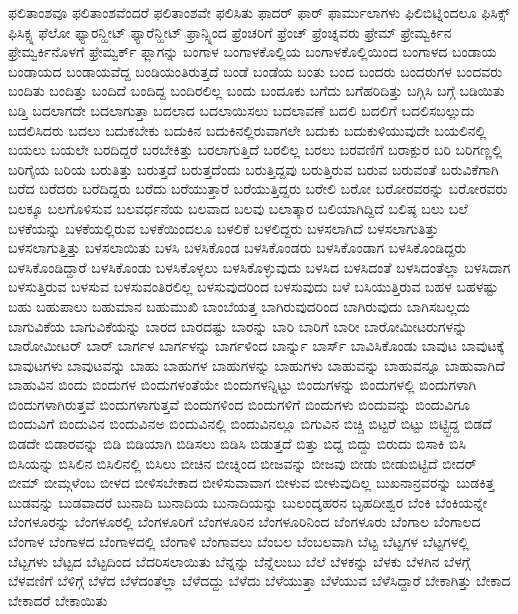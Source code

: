 {ಫಲಿತಾಂಶವೂ
ಫಲಿತಾಂಶವೆಂದರೆ
ಫಲಿತಾಂಶವೇ
ಫಲಿಸಿತು
ಫಾದರ್
ಫಾರ್
ಫಾರ್ಮುಲಾಗಳು
ಫಿಲಿಬಿಟ್ನಿಂದಲೂ
ಫಿಸಿಕ್ಸ್
ಫಿಸಿಕ್ಸ್ನ
ಫೆಲೋ
ಫ್ಯಾರನ್ಹೀಟ್
ಫ್ಯಾರೆನ್ಹೀಟ್
ಫ್ರಾನ್ಸ್ನಿಂದ
ಫ್ರೆಂಚರಿಗೆ
ಫ್ರೆಂಚ್
ಫ್ರೆಂಚ್ನವರು
ಫ್ರೇಮ್
ಫ್ರೇಮ್ವರ್ಕಿನ
ಫ್ರೇಮ್ವರ್ಕಿನೊಳಗೆ
ಫ್ರೇಮ್ವರ್ಕ್
ಫ್ಲಾಗನ್ನು
ಬಂಗಾಳ
ಬಂಗಾಳಕೊಲ್ಲಿಯ
ಬಂಗಾಳಕೊಲ್ಲಿಯಿಂದ
ಬಂಗಾಳದ
ಬಂಡಾಯ
ಬಂಡಾಯದ
ಬಂಡಾಯವೆದ್ದ
ಬಂಡಿಯಂತಿರುತ್ತದೆ
ಬಂಡೆ
ಬಂಡೆಯ
ಬಂತು
ಬಂದ
ಬಂದರು
ಬಂದರುಗಳ
ಬಂದವರು
ಬಂದಿತು
ಬಂದಿತ್ತು
ಬಂದಿದೆ
ಬಂದಿದ್ದ
ಬಂದಿರಲಿಲ್ಲ
ಬಂದು
ಬಂದೂಕು
ಬಗೆದು
ಬಗೆಹರಿದಿತ್ತು
ಬಗ್ಗಿಸಿ
ಬಗ್ಗೆ
ಬಡಿಯಿತು
ಬಡ್ತಿ
ಬದಲಾಗದೇ
ಬದಲಾಗುತ್ತಾ
ಬದಲಾದ
ಬದಲಾಯಿಸಲು
ಬದಲಾವಣೆ
ಬದಲಿ
ಬದಲಿಗೆ
ಬದಲಿಸಬಲ್ಲುದು
ಬದಲಿಸಿದರು
ಬದಲು
ಬದುಕಬೇಕು
ಬದುಕಿನ
ಬದುಕಿನಲ್ಲಿರುವಾಗಲೇ
ಬದುಕು
ಬದುಕುಳಿಯುವುದೇ
ಬಯಲಿನಲ್ಲಿ
ಬಯಲು
ಬಯಲೇ
ಬರದಿದ್ದರೆ
ಬರಬೇಕಿತ್ತು
ಬರಲಾಗುತ್ತಿದೆ
ಬರಲಿಲ್ಲ
ಬರಲು
ಬರವಣಿಗೆ
ಬರಾಕ್ಪುರ
ಬರಿ
ಬರಿಗಣ್ಣಲ್ಲಿ
ಬರಿಗೈಯ
ಬರಿಯ
ಬರುತಿತ್ತು
ಬರುತ್ತದೆ
ಬರುತ್ತದೆಂದು
ಬರುತ್ತಿದ್ದವು
ಬರುತ್ತಿರುವ
ಬರುವ
ಬರುವಂತೆ
ಬರುವಿಕೆಗಾಗಿ
ಬರೆದ
ಬರೆದರು
ಬರೆದಿದ್ದರು
ಬರೆದು
ಬರೆಯುತ್ತಾರೆ
ಬರೆಯುತ್ತಿದ್ದರು
ಬರೇಲಿ
ಬರೋ
ಬರೋರವರನ್ನು
ಬರೋರವರು
ಬಲಕ್ಕೂ
ಬಲಗೊಳಿಸುವ
ಬಲವರ್ಧನೆಯ
ಬಲವಾದ
ಬಲವು
ಬಲಾತ್ಕಾರ
ಬಲಿಯಾಗಿದ್ದಿದೆ
ಬಲಿಷ್ಠ
ಬಲು
ಬಲೆ
ಬಳಕೆಯನ್ನು
ಬಳಕೆಯಲ್ಲಿರುವ
ಬಳಕೆಯಿಂದಲೂ
ಬಳಲಿಕೆ
ಬಳಲಿದ್ದರು
ಬಳಸಲಾಗಿದೆ
ಬಳಸಲಾಗುತಿತ್ತು
ಬಳಸಲಾಗುತ್ತಿತ್ತು
ಬಳಸಲಾಯಿತು
ಬಳಸಿ
ಬಳಸಿಕೊಂಡ
ಬಳಸಿಕೊಂಡರು
ಬಳಸಿಕೊಂಡಾಗ
ಬಳಸಿಕೊಂಡಿದ್ದರು
ಬಳಸಿಕೊಂಡಿದ್ದಾರೆ
ಬಳಸಿಕೊಂಡು
ಬಳಸಿಕೊಳ್ಳಲು
ಬಳಸಿಕೊಳ್ಳುವುದು
ಬಳಸಿದ
ಬಳಸಿದಂತೆ
ಬಳಸಿದಂತೆಲ್ಲಾ
ಬಳಸಿದಾಗ
ಬಳಸುತ್ತಿರುವ
ಬಳಸುವ
ಬಳಸುವಂತಿರಲಿಲ್ಲ
ಬಳಸುವುದರಿಂದ
ಬಳಸುವುದು
ಬಳೆ
ಬಸಿಯುತ್ತಿರುವ
ಬಹಳ
ಬಹಳಷ್ಟು
ಬಹು
ಬಹುಪಾಲು
ಬಹುಮಾನ
ಬಹುಮುಖಿ
ಬಾಂಬೆಯತ್ತ
ಬಾಗಿರುವುದರಿಂದ
ಬಾಗಿರುವುದು
ಬಾಗಿಸಬಲ್ಲದು
ಬಾಗುವಿಕೆಯ
ಬಾಗುವಿಕೆಯನ್ನು
ಬಾರದ
ಬಾರದಷ್ಟು
ಬಾರನ್ನು
ಬಾರಿ
ಬಾರಿಗೆ
ಬಾರೀ
ಬಾರೋಮೀಟರುಗಳನ್ನು
ಬಾರೋಮೀಟರ್
ಬಾರ್
ಬಾರ್ಗಳ
ಬಾರ್ಗಳನ್ನು
ಬಾರ್ಗಳಿಂದ
ಬಾರ್ನ್ನು
ಬಾರ್ಸ್
ಬಾವಿಸಿಕೊಂಡು
ಬಾವುಟ
ಬಾವುಟಕ್ಕೆ
ಬಾವುಟಗಳು
ಬಾವುಟವನ್ನು
ಬಾಹು
ಬಾಹುಗಳ
ಬಾಹುಗಳನ್ನು
ಬಾಹುಗಳು
ಬಾಹುವನ್ನು
ಬಾಹುವನ್ನೂ
ಬಾಹುವಾಗಿದೆ
ಬಾಹುವಿನ
ಬಿಂದು
ಬಿಂದುಗಳ
ಬಿಂದುಗಳಂತೆಯೇ
ಬಿಂದುಗಳನ್ನಿಟ್ಟು
ಬಿಂದುಗಳನ್ನು
ಬಿಂದುಗಳಲ್ಲಿ
ಬಿಂದುಗಳಾಗಿ
ಬಿಂದುಗಳಾಗಿರುತ್ತವೆ
ಬಿಂದುಗಳಾಗುತ್ತವೆ
ಬಿಂದುಗಳಿಂದ
ಬಿಂದುಗಳಿಗೆ
ಬಿಂದುಗಳು
ಬಿಂದುವನ್ನು
ಬಿಂದುವಿಗೂ
ಬಿಂದುವಿಗೆ
ಬಿಂದುವಿನ
ಬಿಂದುವಿನಅ
ಬಿಂದುವಿನಲ್ಲಿ
ಬಿಂದುವಿನಲ್ಲೂ
ಬಿಗುವಿನ
ಬಿಚ್ಚಿ
ಬಿಟ್ಟರೆ
ಬಿಟ್ಟು
ಬಿಟ್ಟ್ಟಿದ್ದ
ಬಿಡದೆ
ಬಿಡದೇ
ಬಿಡಾರವನ್ನು
ಬಿಡಿ
ಬಿಡಿಯಾಗಿ
ಬಿಡಿಸಲು
ಬಿಡಿಸಿ
ಬಿಡುತ್ತದೆ
ಬಿತ್ತು
ಬಿದ್ದ
ಬಿದ್ದು
ಬಿರುದು
ಬಿಸಾಕಿ
ಬಿಸಿ
ಬಿಸಿಯನ್ನು
ಬಿಸಿಲಿನ
ಬಿಸಿಲಿನಲ್ಲಿ
ಬಿಸಿಲು
ಬೀಚಿನ
ಬೀಚ್ನಿಂದ
ಬೀಜವನ್ನು
ಬೀಜವು
ಬೀಡು
ಬೀಡುಬಿಟ್ಟಿದೆ
ಬೀದರ್
ಬೀಮ್
ಬೀಮ್ಗಳೆಂಬ
ಬೀಳದ
ಬೀಳಿಸಬೇಕಾದ
ಬೀಳಿಸುವಾವಾಗ
ಬೀಳುವ
ಬೀಳುವುದಿಲ್ಲ
ಬುಖನಾನ್ರವರನ್ನು
ಬುಡಕಿತ್ತ
ಬುಡವನ್ನು
ಬುಡವಾದರೆ
ಬುನಾದಿ
ಬುನಾದಿಯ
ಬುನಾದಿಯನ್ನು
ಬುಲಂದ್ಶಹರನ
ಬೃಹದೀಶ್ವರ
ಬೆಂಕಿ
ಬೆಂಕಿಯನ್ನೇ
ಬೆಂಗಳೂರನ್ನು
ಬೆಂಗಳೂರಲ್ಲಿ
ಬೆಂಗಳೂರಿಗೆ
ಬೆಂಗಳೂರಿನ
ಬೆಂಗಳೂರಿನಿಂದ
ಬೆಂಗಳೂರು
ಬೆಂಗಾಲ
ಬೆಂಗಾಲದ
ಬೆಂಗಾಳ
ಬೆಂಗಾಳದ
ಬೆಂಗಾಳದಲ್ಲಿ
ಬೆಂಗಾಳಿ
ಬೆಂಗಾವಲು
ಬೆಂಬಲ
ಬೆಂಬಲವಾಗಿ
ಬೆಟ್ಟ
ಬೆಟ್ಟಗಳ
ಬೆಟ್ಟಗಳಲ್ಲಿ
ಬೆಟ್ಟಗಳು
ಬೆಟ್ಟದ
ಬೆಟ್ಟದಿಂದ
ಬೆದರಿಸಲಾಯಿತು
ಬೆನ್ನನ್ನು
ಬೆನ್ನೆಲುಬು
ಬೆಲೆ
ಬೆಳಕನ್ನು
ಬೆಳಕು
ಬೆಳಗಿನ
ಬೆಳಗ್ಗೆ
ಬೆಳವಣಿಗೆ
ಬೆಳಿಗ್ಗೆ
ಬೆಳೆದ
ಬೆಳೆದಂತೆಲ್ಲಾ
ಬೆಳೆದದ್ದು
ಬೆಳೆದು
ಬೆಳೆಯುತ್ತಾ
ಬೆಳೆಯುವ
ಬೆಳೆಸಿದ್ದಾರೆ
ಬೇಕಾಗಿತ್ತು
ಬೇಕಾದ
ಬೇಕಾದರೆ
ಬೇಕಾಯಿತು
}

